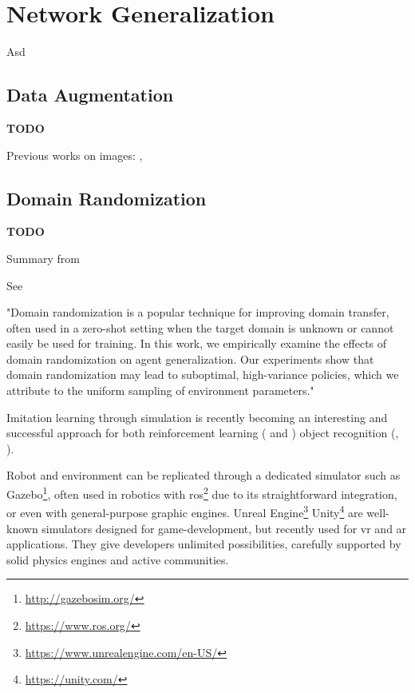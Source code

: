 \section{Network Generalization}
\label{sec:network-generalization}

Asd



\subsection{Data Augmentation}
\label{subsec:data-augmentation}

\textbf{TODO}

Previous works on images: \cite{yue2019domain}, \cite{Takahashi_2020}



\subsection{Domain Randomization}
\label{subsec:domain-randomization}

\textbf{TODO}

Summary from \cite{mehta2019active}

See \cite{weng2019DR_explanation}
 
"Domain randomization is a popular technique for improving domain transfer, often used in a zero-shot setting when the target domain is unknown or cannot easily be used for training. In this work, we empirically examine the effects of domain randomization on agent generalization. Our experiments show that domain randomization may lead to suboptimal, high-variance policies, which we attribute to the uniform sampling of environment parameters."

\medskip

Imitation learning through simulation is recently becoming an interesting and successful approach for both reinforcement learning (\cite{imitation_learning_survey} and \cite{imitation_learning_3d_navigation}) object recognition (\cite{tobin2017domain}, \cite{weng2019DR}).

Robot and environment can be replicated through a dedicated simulator such as Gazebo\footnote{\url{http://gazebosim.org/}}, often used in robotics with \gls{ros}\footnote{\url{https://www.ros.org/}} due to its straightforward integration, or even with general-purpose graphic engines. Unreal Engine\footnote{\url{https://www.unrealengine.com/en-US/}} Unity\footnote{\url{https://unity.com/}} are well-known simulators designed for game-development, but recently used for \gls{vr} and \gls{ar} applications. They give developers unlimited possibilities, carefully supported by solid physics engines and active communities.

